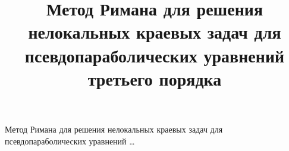 
%

% 


% 












\renewcommand{\firstpage}{15}

\renewcommand{\lastpage}{24}



















\title{Метод Римана для решения нелокальных краевых задач для псевдопараболических уравнений третьего порядка

}%

{Метод Римана для решения нелокальных краевых задач для псевдопараболических уравнений \dots}




